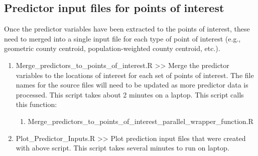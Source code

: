 \subsection{Predictor input files for points of interest}

Once the predictor variables have been extracted to the points of interest, these need to merged into a single input file for each type of point of interest (e.g., geometric county centroid, population-weighted county centroid, etc.).

\begin{enumerate}
\item Merge\_predictors\_to\_points\_of\_interest.R >> Merge the predictor variables to the locations of interest for each set of points of interest. The file names for the source files will need to be updated as more predictor data is processed. This script takes about 2 minutes on a laptop. This script calls this function:

	\begin{enumerate}
	\item Merge\_predictors\_to\_points\_of\_interest\_parallel\_wrapper\_function.R
	\end{enumerate}

\item Plot\_Predictor\_Inputs.R >> Plot prediction input files that were created with above script. This script takes several minutes to run on laptop. 

\end{enumerate}